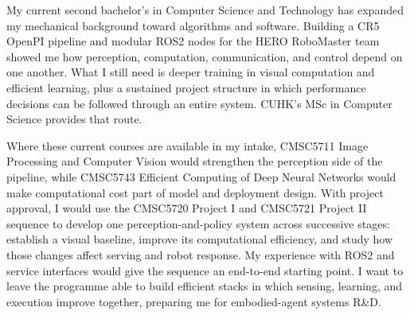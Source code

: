 My current second bachelor's in Computer Science and Technology has expanded my mechanical background toward algorithms and software. Building a CR5 OpenPI pipeline and modular ROS2 nodes for the HERO RoboMaster team showed me how perception, computation, communication, and control depend on one another. What I still need is deeper training in visual computation and efficient learning, plus a sustained project structure in which performance decisions can be followed through an entire system. CUHK's MSc in Computer Science provides that route.

Where these current courses are available in my intake, CMSC5711 Image Processing and Computer Vision would strengthen the perception side of the pipeline, while CMSC5743 Efficient Computing of Deep Neural Networks would make computational cost part of model and deployment design. With project approval, I would use the CMSC5720 Project I and CMSC5721 Project II sequence to develop one perception-and-policy system across successive stages: establish a visual baseline, improve its computational efficiency, and study how those changes affect serving and robot response. My experience with ROS2 and service interfaces would give the sequence an end-to-end starting point. I want to leave the programme able to build efficient stacks in which sensing, learning, and execution improve together, preparing me for embodied-agent systems R\&D.
